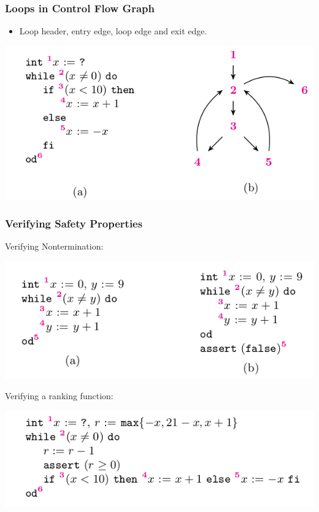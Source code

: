 \documentclass[11pt]{beamer}
\begin{document}
\begin{frame}\frametitle{Loops in Control Flow Graph}
\begin{itemize}
\item Loop header, entry edge, loop edge and exit edge.
\end{itemize}

\begin{center}
\includegraphics[scale=0.4]{cfgloops.png}
\end{center}
\end{frame}

\begin{frame}\frametitle{Verifying Safety Properties}
Verifying Nontermination: 
\begin{center}
\includegraphics[scale=0.4]{vnt.png}
\end{center}

Verifying a ranking function: 
\begin{center}
\includegraphics[scale=0.4]{vrf.png}
\end{center}

\end{frame}
\end{document}
